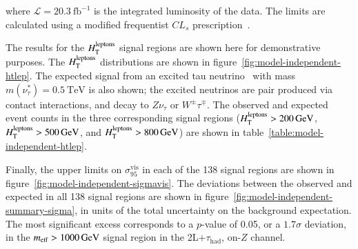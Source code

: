 where $\mathcal{L}=20.3~\mbox{fb}^{-1}$ is the integrated luminosity of the data. The limits are calculated using a modified frequentist $CL_s$ prescription~\cite{cls}. 

The results for the $H_{\mathrm{T}}^{\mathrm{leptons}}$ signal regions are shown here for demonstrative purposes. 
The $H_{\mathrm{T}}^{\mathrm{leptons}}$ distributions are shown in figure~\ref{fig:model-independent-htlep}. The expected signal from an excited tau neutrino~\cite{Baur:1990tu} with mass $m(\nu^*_{\tau})=\SI{0.5}{\tera\electronvolt}$ is also shown; the excited neutrinos are pair produced via contact interactions, and decay to $Z\nu_{\tau}$ or $W^{\pm}\tau^{\mp}$. The observed and expected event counts in the three corresponding signal regions ($H_{\mathrm{T}}^{\mathrm{leptons}}>\SI{200}{\giga\electronvolt}$, $H_{\mathrm{T}}^{\mathrm{leptons}}>\SI{500}{\giga\electronvolt}$, and $H_{\mathrm{T}}^{\mathrm{leptons}}>\SI{800}{\giga\electronvolt}$) are shown in table~\ref{table:model-independent-htlep}. 

Finally, the upper limits on $\sigma_{95}^{\mathrm{vis}}$ in each of the 138 signal regions are shown in figure~\ref{fig:model-independent-sigmavis}. The deviations between the observed and expected in all 138 signal regions are shown in figure~\ref{fig:model-independent-summary-sigma}, in units of the total uncertainty on the background expectation. The most significant excess corresponds to a $p$-value of 0.05, or a $1.7\sigma$ deviation, in the $m_{\mathrm{eff}}>\SI{1000}{\giga\electronvolt}$ signal region in the 2L$+\tau_{\mathrm{had}}$, on-$Z$ channel. 


